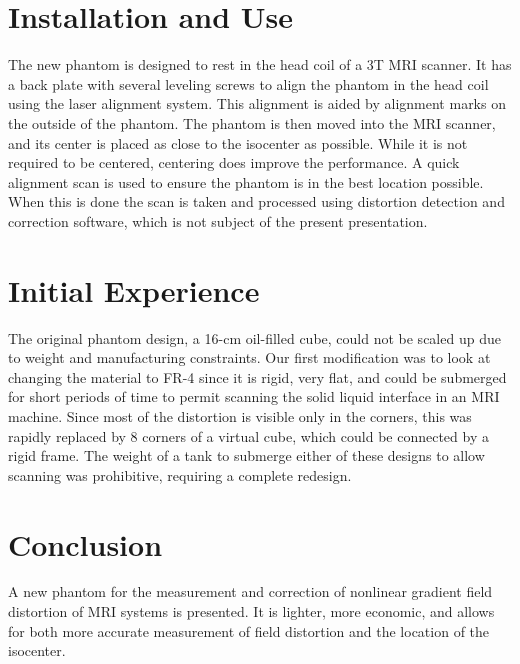 



\section{Installation and Use}

The new phantom is designed to rest in the head coil of a 3T MRI scanner.  It has a back plate with several
leveling screws to align the phantom in the head coil using the laser alignment system.  This alignment is
aided by alignment marks on the outside of the phantom. The phantom is then moved into the MRI scanner,
and its center is placed as close to the isocenter as possible.  While it is not required to be centered,
centering does improve the performance.  A quick alignment scan is used to ensure the phantom is in the best
location possible.  When this is done the scan is taken and processed using distortion detection and
correction software, which is not subject of the present presentation.

\section{Initial Experience}

The original phantom design, a 16-cm oil-filled cube, could not be scaled up due to weight and manufacturing
constraints. Our first modification was to look at changing the material to FR-4 since it is rigid, very flat,
and could be submerged for short periods of time to permit scanning the solid liquid interface in an MRI
machine.  Since most of the distortion is visible only in the corners, this was rapidly replaced by 8 corners
of a virtual cube, which could be connected by a rigid frame.  The weight of a tank to submerge either of
these designs to allow scanning was prohibitive, requiring a complete redesign.

\section{Conclusion}

A new phantom for the measurement and correction of nonlinear gradient field distortion of MRI systems is
presented.  It is lighter, more economic, and allows for both more accurate measurement of field distortion
and the location of the isocenter. 